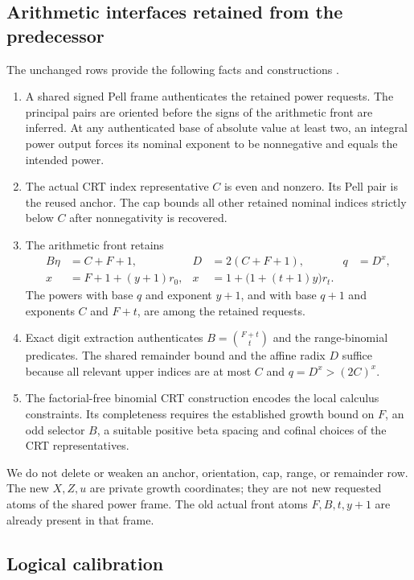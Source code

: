 \documentclass[11pt]{article}
\theoremstyle{definition}
\theoremstyle{remark}
\begin{document}
\subsection{Arithmetic interfaces retained from the predecessor}

The unchanged rows provide the following facts and constructions
\cite{parent,anchor,linearcrt}.
\begin{enumerate}
\item A shared signed Pell frame authenticates the retained power requests.
The principal pairs are oriented before the signs of the arithmetic front
are inferred. At any authenticated base of absolute value at least two,
an integral power output forces its nominal exponent to be nonnegative and
equals the intended power.
\item The actual CRT index representative $C$ is even and nonzero. Its
Pell pair is the reused anchor. The cap bounds all other retained nominal
indices strictly below $C$ after nonnegativity is recovered.
\item The arithmetic front retains
\begin{align}
 B\eta&=C+F+1,& D&=2(C+F+1),& q&=D^x,\label{eq:front1}\\
 x&=F+1+(y+1)r_0,&
 x&=1+\bigl(1+(t+1)y\bigr)r_t.\label{eq:endpoints}
\end{align}
The powers with base $q$ and exponent $y+1$, and with base $q+1$ and
exponents $C$ and $F+t$, are among the retained requests.
\item Exact digit extraction authenticates $B=\binom{F+t}{t}$ and the
range-binomial predicates. The shared remainder bound and the affine radix
$D$ suffice because all relevant upper indices are at most $C$ and
$q=D^x>(2C)^x$.
\item The factorial-free binomial CRT construction encodes the local
calculus constraints. Its completeness requires the established growth
bound on $F$, an odd selector $B$, a suitable positive beta spacing and
cofinal choices of the CRT representatives.
\end{enumerate}

We do not delete or weaken an anchor, orientation, cap, range, or remainder
row. The new $X,Z,u$ are private growth coordinates; they are not new
requested atoms of the shared power frame. The old actual front atoms
$F,B,t,y+1$ are already present in that frame.

\subsection{Logical calibration}
\end{document}
